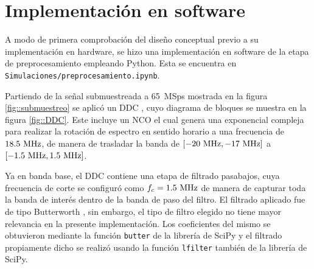 \documentclass[../../main.tex]{subfiles}
\begin{document}



\section{Implementación en software}
A modo de primera comprobación del diseño conceptual previo a su implementación en hardware, se hizo una implementación en software  de la etapa de preprocesamiento empleando Python. 
Esta se encuentra en \texttt{Simulaciones/preprocesamiento.ipynb}. 

Partiendo de la señal submuestreada a 65~MSps mostrada en la figura \ref{fig::submuestreo} se aplicó un DDC \cite{DDC}, cuyo diagrama de bloques se muestra en la figura \ref{fig::DDC}. 
Este incluye un NCO el cual genera una exponencial compleja para realizar la rotación de espectro en sentido horario a una frecuencia de $18.5~\textrm{MHz}$, de manera de trasladar la banda de $[-20~\textrm{MHz}, -17~\textrm{MHz}]$ a $[-1.5~\textrm{MHz}, 1.5~\textrm{MHz}]$. 

Ya en banda base, el DDC contiene una etapa de filtrado pasabajos, cuya frecuencia de corte se configuró como $f_c = 1.5~\textrm{MHz}$ de manera de capturar toda la banda de interés dentro de la banda de paso del filtro. El filtrado aplicado fue de tipo Butterworth \cite{Butterworth}, sin embargo, el tipo de filtro elegido no tiene mayor relevancia en la presente implementación. Los coeficientes del mismo se obtuvieron mediante la función \texttt{butter} \cite{butter} de la librería de SciPy \cite{scipy} y el filtrado propiamente dicho se realizó usando la función \texttt{lfilter} \cite{lfilter} también de la librería de SciPy. 
\end{document}
